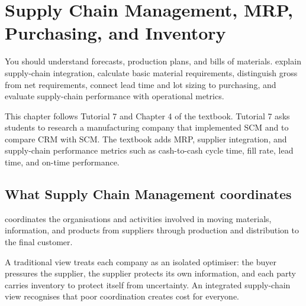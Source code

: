 \chapter{Supply Chain Management, MRP, Purchasing, and Inventory}
\label{ch:scm}

\chapterguide
  {You should understand forecasts, production plans, and bills of materials.}
  {explain supply-chain integration, calculate basic material requirements, distinguish gross from net requirements, connect lead time and lot sizing to purchasing, and evaluate supply-chain performance with operational metrics.}

\begin{sourcebasis}
This chapter follows Tutorial 7 and Chapter 4 of the textbook. Tutorial 7 asks students to research a manufacturing company that implemented SCM and to compare CRM with SCM. The textbook adds MRP, supplier integration, and supply-chain performance metrics such as cash-to-cash cycle time, fill rate, lead time, and on-time performance.
\end{sourcebasis}

\section{What Supply Chain Management coordinates}

 coordinates the organisations and activities involved in moving materials, information, and products from suppliers through production and distribution to the final customer.

A traditional view treats each company as an isolated optimiser: the buyer pressures the supplier, the supplier protects its own information, and each party carries inventory to protect itself from uncertainty. An integrated supply-chain view recognises that poor coordination creates cost for everyone.

\begin{erpfigure}
\end{erpfigure}

